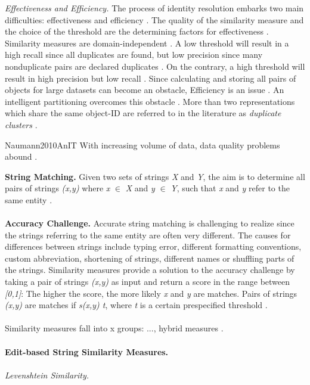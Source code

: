\textit{Effectiveness and Efficiency.} The process of identity resolution embarks two main difficulties: effectiveness and efficiency \cite{Bleiholder2009DataF}.
The quality of the similarity measure and the choice of the threshold are the determining factors for effectiveness \cite{Bleiholder2009DataF}.
Similarity measures are domain-independent \cite{Bleiholder2009DataF}.
A low threshold will result in a high recall since all duplicates are found, but low precision since many nonduplicate pairs are declared duplicates \cite{Bleiholder2009DataF}.
On the contrary, a high threshold will result in high precision but low recall \cite{Bleiholder2009DataF}.
Since calculating and storing all pairs of objects for large datasets can become an obstacle, Efficiency is an issue \cite{Bleiholder2009DataF}.
An intelligent partitioning overcomes this obstacle \cite{Bleiholder2009DataF}.
More than two representations which share the same object-ID are referred to in the literature as \textit{duplicate clusters} \cite{Bleiholder2009DataF}.

Naumann2010AnIT
With increasing volume of data, data quality problems abound \cite{Naumann2010AnIT}.

\textbf{String Matching.}
Given two sets of strings \textit{X} and \textit{Y}, the aim is to determine all pairs of strings \textit{(x,y)} where \textit{x} $\in$ \textit{X} and \textit{y} $\in$ \textit{Y}, such that \textit{x} and \textit{y} refer to the same entity \cite{Doan2012PrinciplesOD}. \\
\\
\textbf{Accuracy Challenge.} Accurate string matching is challenging to realize since the strings referring to the same entity are often very different. The causes for differences between strings include typing error, different formatting conventions, custom abbreviation, shortening of strings, different names or shuffling parts of the strings. Similarity measures provide a solution to the accuracy challenge by taking a pair of strings \textit{(x,y)} as input and return a score in the range between \textit{[0,1]}: The higher the score, the more likely \textit{x} and \textit{y} are matches. Pairs of strings \textit{(x,y)} are matches if \textit{s(x,y) \geq t}, where \textit{t} is a certain prespecified threshold \cite{Doan2012PrinciplesOD}. \\
\\
Similarity measures fall into x groups: ..., hybrid measures \cite{Doan2012PrinciplesOD}. \\
\\
\textbf{Edit-based String Similarity Measures.} \\
\\
\textit{Levenshtein Similarity.}


